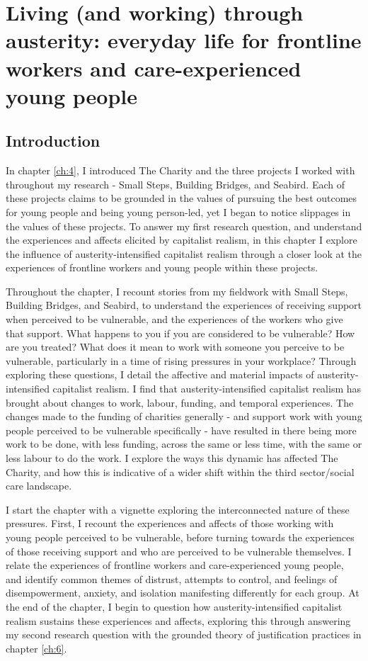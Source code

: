 \chapter{Living (and working) through austerity: everyday life for frontline workers and care-experienced young people}
\label{ch:5}

\section{Introduction}
\label{sec:5-intro}

In chapter \ref{ch:4}, I introduced The Charity and the three projects I worked with throughout my research - Small Steps, Building Bridges, and Seabird. Each of these projects claims to be grounded in the values of pursuing the best outcomes for young people and being young person-led, yet I began to notice slippages in the values of these projects. To answer my first research question, and understand the experiences and affects elicited by capitalist realism, in this chapter I explore the influence of austerity-intensified capitalist realism through a closer look at the experiences of frontline workers and young people within these projects.

Throughout the chapter, I recount stories from my fieldwork with Small Steps, Building Bridges, and Seabird, to understand the experiences of receiving support when perceived to be vulnerable, and the experiences of the workers who give that support. What happens to you if you are considered to be vulnerable? How are you treated? What does it mean to work with someone you perceive to be vulnerable, particularly in a time of rising pressures in your workplace? Through exploring these questions, I detail the affective and material impacts of austerity-intensified capitalist realism. I find that austerity-intensified capitalist realism has brought about changes to work, labour, funding, and temporal experiences. The changes made to the funding of charities generally - and support work with young people perceived to be vulnerable specifically - have resulted in there being more work to be done, with less funding, across the same or less time, with the same or less labour to do the work. I explore the ways this dynamic has affected The Charity, and how this is indicative of a wider shift within the third sector/social care landscape. 

I start the chapter with a vignette exploring the interconnected nature of these pressures. First, I recount the experiences and affects of those working with young people perceived to be vulnerable, before turning towards the experiences of those receiving support and who are perceived to be vulnerable themselves. I relate the experiences of frontline workers and care-experienced young people, and identify common themes of distrust, attempts to control, and feelings of disempowerment, anxiety, and isolation manifesting differently for each group. At the end of the chapter, I begin to question how austerity-intensified capitalist realism sustains these experiences and affects, exploring this through answering my second research question with the grounded theory of justification practices  in chapter \ref{ch:6}. 

